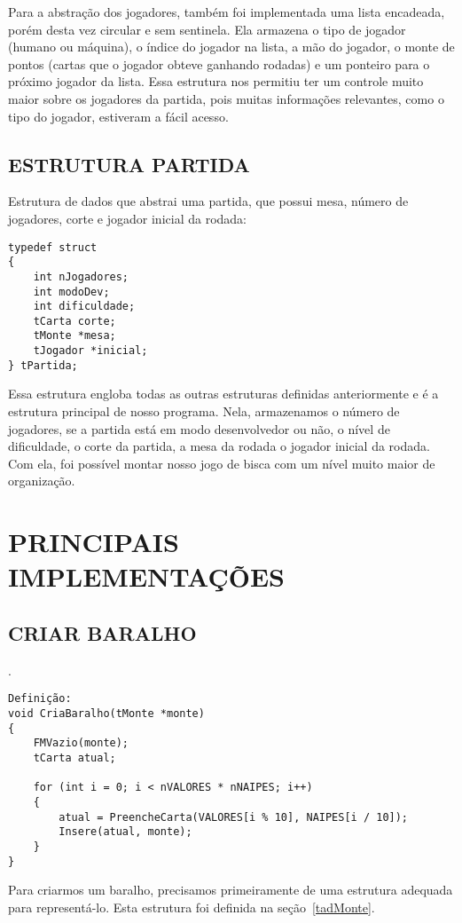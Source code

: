 \documentclass[12pt, oneside, a4paper, brazil]{abntex2}
\begin{document}
Para a abstração dos jogadores, também foi implementada uma lista encadeada, porém desta vez circular e sem sentinela.
Ela armazena o tipo de jogador (humano ou máquina), o índice do jogador na lista, a mão do jogador, o monte de pontos (cartas que o jogador obteve ganhando rodadas) e um ponteiro para o próximo jogador da lista.
Essa estrutura nos permitiu ter um controle muito maior sobre os jogadores da partida, pois muitas informações relevantes, como o tipo do jogador, estiveram a fácil acesso.

\section{ESTRUTURA PARTIDA}
Estrutura de dados que abstrai uma partida, que possui mesa, número de jogadores, corte e jogador inicial da rodada:
\begin{lstlisting}
typedef struct
{
    int nJogadores;
    int modoDev;
    int dificuldade;
    tCarta corte;
    tMonte *mesa;
    tJogador *inicial;
} tPartida;
\end{lstlisting}
Essa estrutura engloba todas as outras estruturas definidas anteriormente e é a estrutura principal de nosso programa.
Nela, armazenamos o número de jogadores, se a partida está em modo desenvolvedor ou não, o nível de dificuldade, o corte da partida, a mesa da rodada o jogador inicial da rodada. Com ela, foi possível montar nosso jogo de bisca com um nível muito maior de organização.


\chapter{PRINCIPAIS IMPLEMENTAÇÕES}\label{cap:4}

\section{CRIAR BARALHO}\label{se:implementaçãoCriaBaralho}.
\begin{lstlisting}
Definição:
void CriaBaralho(tMonte *monte)
{
    FMVazio(monte);
    tCarta atual;

    for (int i = 0; i < nVALORES * nNAIPES; i++)
    {
        atual = PreencheCarta(VALORES[i % 10], NAIPES[i / 10]);
        Insere(atual, monte);
    }
}
\end{lstlisting}

Para criarmos um baralho, precisamos primeiramente de uma estrutura adequada para representá-lo. Esta estrutura foi definida na seção~\ref{tadMonte}.
\end{document}
